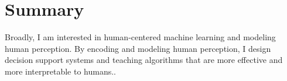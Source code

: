 
\section{Summary}




Broadly, I am interested in human-centered machine learning and modeling human perception. By encoding and modeling human perception, I design decision support systems and teaching algorithms that are more effective and more interpretable to humans..




